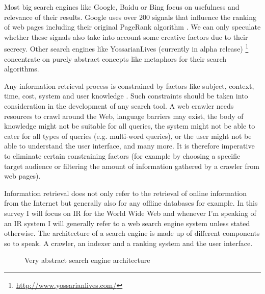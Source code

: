 Most big search engines like Google, Baidu or Bing focus on usefulness and relevance of their results.\citep{Google2012, Baidu2012, Microsoft2012a} Google uses over 200 signals \citep{Google2012} that influence the ranking of web pages including their original PageRank algorithm \citep{Brin1998, Brin1998b}. We can only speculate whether these signals also take into account some creative factors due to their secrecy. Other search engines like YossarianLives (currently in alpha release) \footnote{\url{http://www.yossarianlives.com/}} concentrate on purely abstract concepts like metaphors for their search algorithms.

Any information retrieval process is constrained by factors like subject, context, time, cost, system and user knowledge \citep{Marchionini1988}. Such constraints should be taken into consideration in the development of any search tool. A web crawler needs resources to crawl around the Web, language barriers may exist, the body of knowledge might not be suitable for all queries, the system might not be able to cater for all types of queries (e.g. multi-word queries), or the user might not be able to understand the user interface, and many more. It is therefore imperative to eliminate certain constraining factors (for example by choosing a specific target audience or filtering the amount of information gathered by a crawler from web pages).

Information retrieval does not only refer to the retrieval of online information from the Internet but generally also for any offline databases for example. In this survey I will focus on IR for the World Wide Web and whenever I'm speaking of an IR system I will generally refer to a web search engine system unless stated otherwise. The architecture of a search engine is made up of different components so to speak. A crawler, an indexer and a ranking system and the user interface.

\begin{figure}[htb]
  \centering
\caption[Search Engine Architecture]{Very abstract search engine architecture}
\label{fig:SEA}
\end{figure}

